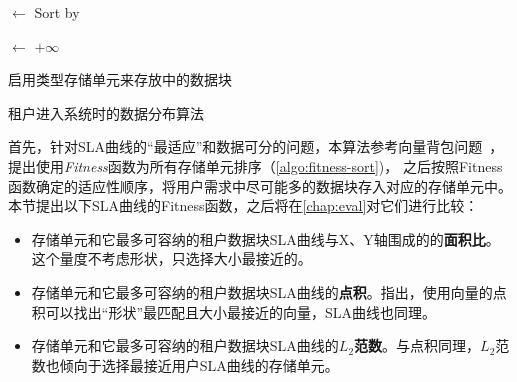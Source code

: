 \IncMargin{1em}
\begin{algorithm}[h]
  \SetAlgoLined
  \BlankLine

  \Suitable$\leftarrow$  \;%
  Sort \Suitable by \Fitness \; \label{algo:fitness-sort}


  
  \BestCost $\leftarrow$ $+\infty$


  启用\BestType 类型存储单元来存放\Request 中的数据块 \;

  \caption{租户进入系统时的数据分布算法}
  \label{algo:tenant-allocation}
\end{algorithm}
\DecMargin{1em}

首先，针对SLA曲线的“最适应”和数据可分的问题，本算法参考向量背包问题~\cite{panigrahy2011heuristics}，提出使用\textit{Fitness}函数为所有存储单元排序（\autoref{algo:fitness-sort})，
之后按照Fitness函数确定的适应性顺序，将用户需求中尽可能多的数据块存入对应的存储单元中。
本节提出以下SLA曲线的Fitness函数，之后将在\autoref{chap:eval}对它们进行比较：

\begin{itemize}
  \item 存储单元和它最多可容纳的租户数据块SLA曲线与X、Y轴围成的的\textbf{面积比}。这个量度不考虑形状，只选择大小最接近的。
  \item 存储单元和它最多可容纳的租户数据块SLA曲线的\textbf{点积}。\citet{panigrahy2011heuristics,gabay2016vector}指出，使用向量的点积可以找出“形状”最匹配且大小最接近的向量，SLA曲线也同理。
  \item 存储单元和它最多可容纳的租户数据块SLA曲线的\textbf{$L_2$范数}。与点积同理，$L_2$范数也倾向于选择最接近用户SLA曲线的存储单元。
\end{itemize}

